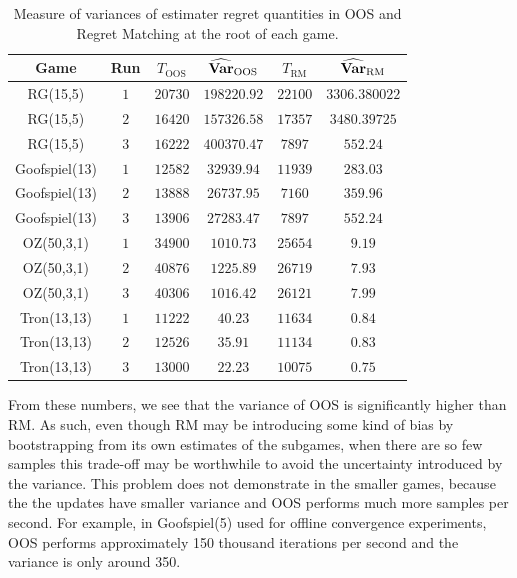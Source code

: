 {\begin{table}
\centering
\begin{footnotesize}
\begin{tabular}{|c||c|c|c|c|c|}
\hline
Game & Run & $T_{\text{OOS}}$ & $\widehat{\mathbf{Var}}_{\text{OOS}}$ & $T_{\text{RM}}$ & $\widehat{\mathbf{Var}}_{\text{RM}}$ \\
\hline
RG(15,5)	& $1$	& $20730$	& $198220.92$	& $22100$	& $3306.380022$ \\
RG(15,5)	& $2$	& $16420$	& $157326.58$	& $17357$	& $3480.39725$ \\
RG(15,5)	& $3$	& $16222$	& $400370.47$	& $7897$	& $552.24$ \\
\hline
Goofspiel(13)	& $1$	& $12582$	& $32939.94$	& $11939$	& $283.03$ \\
Goofspiel(13)	& $2$	& $13888$	& $26737.95$	& $7160$	& $359.96$ \\
Goofspiel(13)	& $3$	& $13906$	& $27283.47$	& $7897$	& $552.24$ \\
\hline
OZ(50,3,1) &	$1$ &	$34900$	& $1010.73$ & $25654$	& $9.19$ \\
OZ(50,3,1) &	$2$	& $40876$	& $1225.89$ & $26719$	& $7.93$ \\
OZ(50,3,1) &	$3$	& $40306$	& $1016.42$ & $26121$	& $7.99$ \\
\hline
Tron(13,13) & $1$	& $11222$	& $40.23$ & $11634$ &	$0.84$ \\
Tron(13,13)	& $2$	& $12526$	& $35.91$ & $11134$	& $0.83$ \\
Tron(13,13)	& $3$	& $13000$	& $22.23$ & $10075$ & $0.75$ \\
\hline
\end{tabular}
\end{footnotesize}
\caption{Measure of variances of estimater regret quantities in OOS and Regret Matching at the root of each game.\label{tab:oos_vs_rm}}
\end{table}

From these numbers, we see that the variance of OOS is significantly higher than RM. As such, even though RM may be introducing
some kind of bias by bootstrapping from its own estimates of the subgames, when there are so few samples this trade-off may be worthwhile
to avoid the uncertainty introduced by the variance. This problem does not demonstrate in the smaller games, because the the updates have smaller variance and OOS performs much more samples per second. For example, in Goofspiel(5) used for offline convergence experiments, OOS performs approximately 150 thousand iterations per second and the variance is only around 350. 



}


